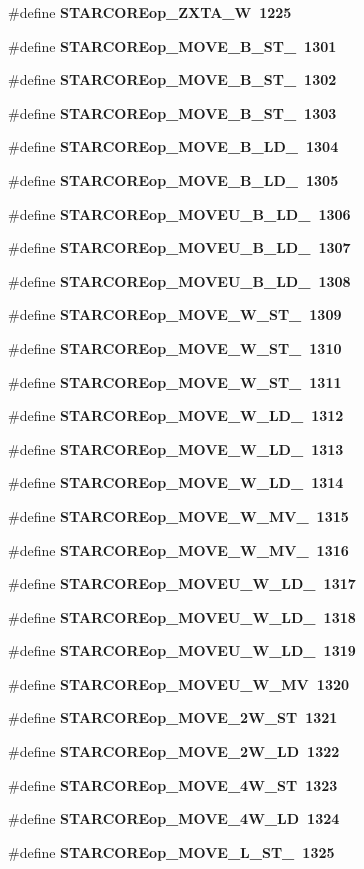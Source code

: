 \begin{CompactItemize}
\#define \bf{STARCOREop\_\-ZXTA\_\-W}~1225
\item 
\#define \bf{STARCOREop\_\-MOVE\_\-B\_\-ST\_}~1301
\item 
\#define \bf{STARCOREop\_\-MOVE\_\-B\_\-ST\_}~1302
\item 
\#define \bf{STARCOREop\_\-MOVE\_\-B\_\-ST\_}~1303
\item 
\#define \bf{STARCOREop\_\-MOVE\_\-B\_\-LD\_}~1304
\item 
\#define \bf{STARCOREop\_\-MOVE\_\-B\_\-LD\_}~1305
\item 
\#define \bf{STARCOREop\_\-MOVEU\_\-B\_\-LD\_}~1306
\item 
\#define \bf{STARCOREop\_\-MOVEU\_\-B\_\-LD\_}~1307
\item 
\#define \bf{STARCOREop\_\-MOVEU\_\-B\_\-LD\_}~1308
\item 
\#define \bf{STARCOREop\_\-MOVE\_\-W\_\-ST\_}~1309
\item 
\#define \bf{STARCOREop\_\-MOVE\_\-W\_\-ST\_}~1310
\item 
\#define \bf{STARCOREop\_\-MOVE\_\-W\_\-ST\_}~1311
\item 
\#define \bf{STARCOREop\_\-MOVE\_\-W\_\-LD\_}~1312
\item 
\#define \bf{STARCOREop\_\-MOVE\_\-W\_\-LD\_}~1313
\item 
\#define \bf{STARCOREop\_\-MOVE\_\-W\_\-LD\_}~1314
\item 
\#define \bf{STARCOREop\_\-MOVE\_\-W\_\-MV\_}~1315
\item 
\#define \bf{STARCOREop\_\-MOVE\_\-W\_\-MV\_}~1316
\item 
\#define \bf{STARCOREop\_\-MOVEU\_\-W\_\-LD\_}~1317
\item 
\#define \bf{STARCOREop\_\-MOVEU\_\-W\_\-LD\_}~1318
\item 
\#define \bf{STARCOREop\_\-MOVEU\_\-W\_\-LD\_}~1319
\item 
\#define \bf{STARCOREop\_\-MOVEU\_\-W\_\-MV}~1320
\item 
\#define \bf{STARCOREop\_\-MOVE\_\-2W\_\-ST}~1321
\item 
\#define \bf{STARCOREop\_\-MOVE\_\-2W\_\-LD}~1322
\item 
\#define \bf{STARCOREop\_\-MOVE\_\-4W\_\-ST}~1323
\item 
\#define \bf{STARCOREop\_\-MOVE\_\-4W\_\-LD}~1324
\item 
\#define \bf{STARCOREop\_\-MOVE\_\-L\_\-ST\_}~1325
\item 

\end{CompactItemize}

